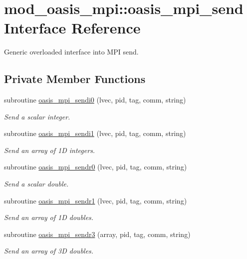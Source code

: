 \hypertarget{interfacemod__oasis__mpi_1_1oasis__mpi__send}{}\section{mod\+\_\+oasis\+\_\+mpi\+:\+:oasis\+\_\+mpi\+\_\+send Interface Reference}
\label{interfacemod__oasis__mpi_1_1oasis__mpi__send}


Generic overloaded interface into M\+PI send.  


\subsection*{Private Member Functions}
\begin{DoxyCompactItemize}
\item 
subroutine \hyperlink{interfacemod__oasis__mpi_1_1oasis__mpi__send_a5b7f0e4f7dc45d398bf564a324dc71c7}{oasis\+\_\+mpi\+\_\+sendi0} (lvec, pid, tag, comm, string)
\begin{DoxyCompactList}\small\item\em Send a scalar integer. \end{DoxyCompactList}\item 
subroutine \hyperlink{interfacemod__oasis__mpi_1_1oasis__mpi__send_af94ce9cce54b9860809fc63d59674e5b}{oasis\+\_\+mpi\+\_\+sendi1} (lvec, pid, tag, comm, string)
\begin{DoxyCompactList}\small\item\em Send an array of 1D integers. \end{DoxyCompactList}\item 
subroutine \hyperlink{interfacemod__oasis__mpi_1_1oasis__mpi__send_aefceb49505c9c2e1431ad2666657910d}{oasis\+\_\+mpi\+\_\+sendr0} (lvec, pid, tag, comm, string)
\begin{DoxyCompactList}\small\item\em Send a scalar double. \end{DoxyCompactList}\item 
subroutine \hyperlink{interfacemod__oasis__mpi_1_1oasis__mpi__send_adf9edd2b024a94a75db93e68318f6eff}{oasis\+\_\+mpi\+\_\+sendr1} (lvec, pid, tag, comm, string)
\begin{DoxyCompactList}\small\item\em Send an array of 1D doubles. \end{DoxyCompactList}\item 
subroutine \hyperlink{interfacemod__oasis__mpi_1_1oasis__mpi__send_ad712319885937ce4c29b7bb8e66614cf}{oasis\+\_\+mpi\+\_\+sendr3} (array, pid, tag, comm, string)
\begin{DoxyCompactList}\small\item\em Send an array of 3D doubles. \end{DoxyCompactList}\end{DoxyCompactItemize}


